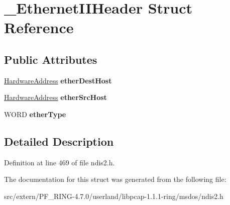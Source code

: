 \hypertarget{struct___ethernet_i_i_header}{
\section{\_\-EthernetIIHeader Struct Reference}
\label{struct___ethernet_i_i_header}
}
\subsection*{Public Attributes}
\begin{DoxyCompactItemize}
\item 
\hypertarget{struct___ethernet_i_i_header_afa931ce470bf26d6a40943e2e54a212b}{
\hyperlink{union___hardware_address}{HardwareAddress} {\bfseries etherDestHost}}
\label{struct___ethernet_i_i_header_afa931ce470bf26d6a40943e2e54a212b}

\item 
\hypertarget{struct___ethernet_i_i_header_a3c595291a100e11c3495f72e186dffde}{
\hyperlink{union___hardware_address}{HardwareAddress} {\bfseries etherSrcHost}}
\label{struct___ethernet_i_i_header_a3c595291a100e11c3495f72e186dffde}

\item 
\hypertarget{struct___ethernet_i_i_header_af08baddc4b791ef1da13a0b4ddd6a857}{
WORD {\bfseries etherType}}
\label{struct___ethernet_i_i_header_af08baddc4b791ef1da13a0b4ddd6a857}

\end{DoxyCompactItemize}


\subsection{Detailed Description}


Definition at line 469 of file ndis2.h.



The documentation for this struct was generated from the following file:\begin{DoxyCompactItemize}
\item 
src/extern/PF\_\-RING-\/4.7.0/userland/libpcap-\/1.1.1-\/ring/msdos/ndis2.h\end{DoxyCompactItemize}
